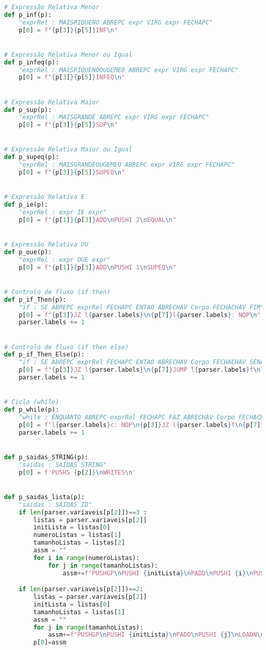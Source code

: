 \documentclass[11pt,a4paper]{report}%
\begin{document}
\begin{scriptsize}
\begin{lstlisting}[language=python]
# Expressão Relativa Menor
def p_inf(p):
    "exprRel : MAISPIQUENO ABREPC expr VIRG expr FECHAPC"
    p[0] = f"{p[3]}{p[5]}INF\n"


# Expressão Relativa Menor ou Igual
def p_infeq(p):
    "exprRel : MAISPIQUENOOUGEMEO ABREPC expr VIRG expr FECHAPC"
    p[0] = f"{p[3]}{p[5]}INFEQ\n"


# Expressão Relativa Maior
def p_sup(p):
    "exprRel : MAISGRANDE ABREPC expr VIRG expr FECHAPC"
    p[0] = f"{p[3]}{p[5]}SUP\n"


# Expressão Relativa Maior ou Igual
def p_supeq(p):
    "exprRel : MAISGRANDEOUGEMEO ABREPC expr VIRG expr FECHAPC"
    p[0] = f"{p[3]}{p[5]}SUPEQ\n"


# Expressão Relativa E
def p_ie(p):
    "exprRel : expr IE expr"
    p[0] = f"{p[1]}{p[3]}ADD\nPUSHI 2\nEQUAL\n"


# Expressão Relativa OU
def p_oue(p):
    "exprRel : expr OUE expr"
    p[0] = f"{p[1]}{p[3]}ADD\nPUSHI 1\nSUPEQ\n"


# Controlo de fluxo (if then)
def p_if_Then(p):
    "if : SE ABREPC exprRel FECHAPC ENTAO ABRECHAV Corpo FECHACHAV FIM"
    p[0] = f"{p[3]}JZ l{parser.labels}\n{p[7]}l{parser.labels}: NOP\n"
    parser.labels += 1


# Controlo de fluxo (if then else)
def p_if_Then_Else(p):
    "if : SE ABREPC exprRel FECHAPC ENTAO ABRECHAV Corpo FECHACHAV SENAO ABRECHAV Corpo FECHACHAV FIM"
    p[0] = f"{p[3]}JZ l{parser.labels}\n{p[7]}JUMP l{parser.labels}f\nl{parser.labels}: NOP\n{p[11]}l{parser.labels}f: NOP\n"
    parser.labels += 1


# Ciclo (while)
def p_while(p):
    "while : ENQUANTO ABREPC exprRel FECHAPC FAZ ABRECHAV Corpo FECHACHAV FIM"
    p[0] = f'l{parser.labels}c: NOP\n{p[3]}JZ l{parser.labels}f\n{p[7]}JUMP l{parser.labels}c\nl{parser.labels}f: NOP\n'
    parser.labels += 1


def p_saidas_STRING(p):
    "saidas : SAIDAS STRING"
    p[0] = f'PUSHS {p[2]}\nWRITES\n'


def p_saidas_lista(p):
    "saidas : SAIDAS ID"
    if len(parser.variaveis[p[2]])==3 :
        listas = parser.variaveis[p[2]]
        initLista = listas[0]
        numeroListas = listas[1]
        tamanhoListas = listas[2]
        assm = ""
        for i in range(numeroListas):
            for j in range(tamanhoListas):
                assm+=f"PUSHGP\nPUSHI {initLista}\nPADD\nPUSHI {i}\nPUSHI {tamanhoListas}\nPADD\nPUSHI {j}\nLOADN\nWRITEI\n"

    if len(parser.variaveis[p[2]])==2:
        listas = parser.variaveis[p[2]]
        initLista = listas[0]
        tamanhoListas = listas[1]
        assm = ""
        for j in range(tamanhoListas):
            assm+=f"PUSHGP\nPUSHI {initLista}\nPADD\nPUSHI {j}\nLOADN\nWRITEI\n"
        p[0]=assm


\end{lstlisting}
\end{scriptsize}
\end{document}
